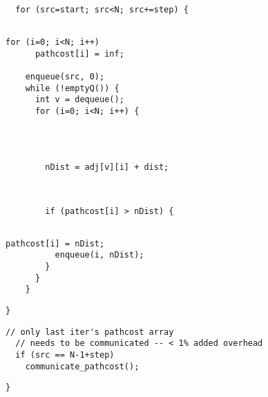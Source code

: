 \begin{lstlisting}[morekeywords={pathcost}, aboveskip=0pt,
belowskip=0pt, firstnumber=24,name=dij_checks,showlines=true]

  for (src=start; src<N; src+=step) {


\end{lstlisting}
\begin{lstlisting}[morekeywords={pathcost,dist}, aboveskip=0pt,
belowskip=0pt, firstnumber=28,name=dij_checks,showlines=true]
    for (i=0; i<N; i++)
      pathcost[i] = inf;

    enqueue(src, 0);
    while (!emptyQ()) {
      int v = dequeue();
      for (i=0; i<N; i++) {
\end{lstlisting}
\begin{lstlisting}[morekeywords={pathcost,dist,nDist}, aboveskip=0pt,
belowskip=0pt, firstnumber=auto,name=dij_checks,showlines=true]



        nDist = adj[v][i] + dist;
\end{lstlisting}
\begin{lstlisting}[morekeywords={pathcost}, aboveskip=0pt,
belowskip=0pt, firstnumber=auto,name=dij_checks,showlines=true]


        if (pathcost[i] > nDist) {


\end{lstlisting}
\begin{lstlisting}[morekeywords={pathcost}, aboveskip=0pt,
belowskip=0pt, firstnumber=auto,name=dij_checks]
          pathcost[i] = nDist;
          enqueue(i, nDist);
        }
      }
    }
\end{lstlisting}

\begin{lstlisting}[morekeywords={pathcost,dist}, aboveskip=0pt,
belowskip=0pt, firstnumber=auto,name=dij_checks,showlines=true]
  }
\end{lstlisting}

\begin{lstlisting}[morekeywords={pathcost},
aboveskip=0pt,belowskip=0pt,backgroundcolor=\color{lightgray},
firstnumber=auto, name=dij_checks,showlines=true]
  // only last iter's pathcost array
  // needs to be communicated -- < 1% added overhead
  if (src == N-1+step)
    communicate_pathcost();
\end{lstlisting}

\begin{lstlisting}[morekeywords={pathcost}, aboveskip=0pt,
belowskip=0pt, firstnumber=auto,name=dij_checks]
}
\end{lstlisting}
